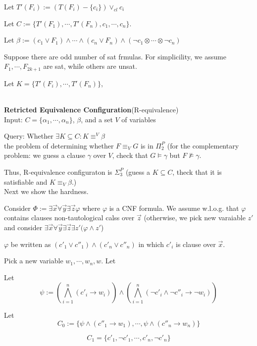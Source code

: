 \documentclass[12pt]{article}
\begin{document}
Let $T'(F_i):=(T(F_i)-\{c_i\})\vee_{cl} c_i$

Let $C:=\{T'(F_1), \cdots, T'(F_n), c_1, \cdots, c_n\}$.


Let $\beta:=( c_1\vee F_1)\wedge\cdots\wedge (c_n\vee F_n)\wedge (\neg c_1\otimes \cdots \otimes \neg c_n)$


Suppose there are odd number of sat frmulas. For simplicility, we assume $F_1, \cdots, F_{2k+1}$ are sat, while others are unsat. 

Let $K=\{T'(F_i),\cdots, T'(F_n)\}$, 



\ \\

{\bf Retricted Equivalence Configuration}(R-equivalence)\\

Input: $C=\{\alpha_1,\cdots,\alpha_n\}$, $\beta$, and a set $V$ of variables

Query: Whether $\exists K\subseteq C: K\equiv^V \beta$\\ 



the problem of determining whether $F\equiv_V G$  is in $\Pi_2^P$ (for the complementary problem: we guess a clause $\gamma$ over $V$, check that $G\models \gamma$ but $F\not\models \gamma$. 

Thus, R-equivalence configuraton is $\Sigma_3^P$ (guess a $K\subseteq C$, theck that it is satisfiable and $K\equiv_V \beta$.) \\


Next we show the hardness.

Consider $\Phi:=\exists \vec{x}\forall\vec{y}\exists \vec{z} \varphi$ where $\varphi$ is a CNF formula. We assume w.l.o.g. that $\varphi$ contains clauses non-tautological calss over $\vec{z}$ (otherwise, we pick new varaiable $z'$ and consider $\exists\vec{x}\forall\vec{y}\exists\vec{z}\exists z'(\varphi\wedge z'$)

$\varphi$ be written as $(c'_1\vee c''_1)\wedge (c'_n\vee c''_n)$ in which $c'_i$ is clause over $\vec{x}$.

Pick a new variable $w_1, \cdots, w_n,w$. Let 

Let $$\psi:= \left(\bigwedge_{i=1}^n (c'_i\rightarrow w_i)\right)\wedge 
\left(\bigwedge_{i=1}^n(\neg c'_i\wedge \neg c''_i\rightarrow \neg w_i)\right)$$

Let $$C_0:=\{\psi\wedge  (c''_1\rightarrow w_1) , \cdots, \psi\wedge (c''_n\rightarrow w_n)\}$$

$$C_1=\{c'_1, \neg c'_1,\cdots, c'_n, \neg c'_n\}$$
\end{document}
